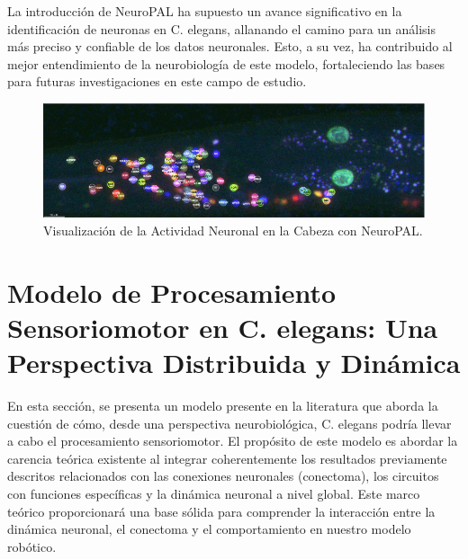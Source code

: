 La introducción de NeuroPAL ha supuesto un avance significativo en la identificación de neuronas en C. elegans, allanando el camino para un análisis más preciso y confiable de los datos neuronales. Esto, a su vez, ha contribuido al mejor entendimiento de la neurobiología de este modelo, fortaleciendo las bases para futuras investigaciones en este campo de estudio.

\begin{figure}[h!]
	\centering\includegraphics[width=\imsize]{neuropal.png}
	\caption[Visualización de la Actividad Neuronal en la Cabeza con NeuroPAL.	]{ Visualización de la Actividad Neuronal en la Cabeza con NeuroPAL.}\label{fig:neuropal}
\end{figure}


\section{Modelo de Procesamiento Sensoriomotor en C. elegans: Una Perspectiva Distribuida y Dinámica}\label{sec:modelo}

En esta sección, se presenta un modelo presente en la literatura que aborda la cuestión de cómo, desde una perspectiva neurobiológica, C. elegans podría llevar a cabo el procesamiento sensoriomotor. El propósito de este modelo es abordar la carencia teórica existente al integrar coherentemente los resultados previamente descritos relacionados con las conexiones neuronales (conectoma), los circuitos con funciones específicas y la dinámica neuronal a nivel global.  Este marco teórico proporcionará una base sólida para comprender la interacción entre la dinámica neuronal, el conectoma y el comportamiento en nuestro modelo robótico.


